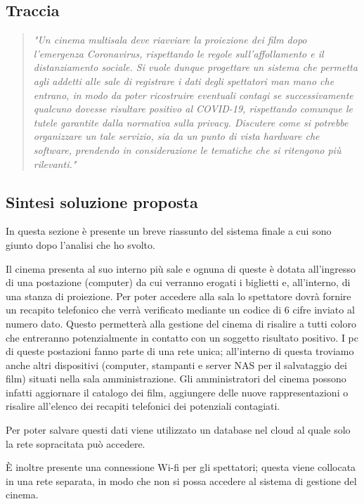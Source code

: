 \documentclass{article}
\begin{document}
\subsection{Traccia}
\begin{quotation}
\textit{"Un cinema multisala deve riavviare la proiezione dei film dopo l'emergenza Coronavirus, rispettando le regole sull'affollamento e il distanziamento sociale. 
Si vuole dunque progettare un sistema che permetta agli addetti alle sale di registrare i dati degli spettatori man mano che entrano, in modo da poter ricostruire
eventuali contagi se successivamente qualcuno dovesse risultare positivo al COVID-19, rispettando comunque le tutele garantite dalla normativa sulla privacy.
Discutere come si potrebbe organizzare un tale servizio, sia da un punto di vista hardware che software, prendendo in considerazione le tematiche che si ritengono più rilevanti."}
\end{quotation}

\subsection{Sintesi soluzione proposta}
In questa sezione è presente un breve riassunto del sistema finale a cui sono giunto dopo l'analisi che ho svolto.

Il cinema presenta al suo interno più sale e ognuna di queste è dotata all'ingresso di una postazione (computer) da cui verranno erogati i biglietti e, all'interno, di una stanza di proiezione. Per poter accedere alla sala lo spettatore dovrà fornire un recapito telefonico che verrà verificato mediante un codice di 6 cifre inviato al numero dato. Questo permetterà alla gestione del cinema di risalire a tutti coloro che entreranno potenzialmente in contatto con un soggetto risultato positivo. I pc di queste postazioni fanno parte di una rete unica; all'interno di questa troviamo anche altri dispositivi (computer, stampanti e server NAS per il salvataggio dei film) situati nella sala amministrazione. Gli amministratori del cinema possono infatti aggiornare il catalogo dei film, aggiungere delle nuove rappresentazioni o risalire all'elenco  dei recapiti telefonici dei potenziali contagiati.

Per poter salvare questi dati viene utilizzato un database nel cloud al quale solo la rete sopracitata può accedere.

È inoltre presente una connessione Wi-fi per gli spettatori; questa viene collocata in una rete separata, in modo che non si possa accedere al sistema di gestione del cinema.
\end{document}
